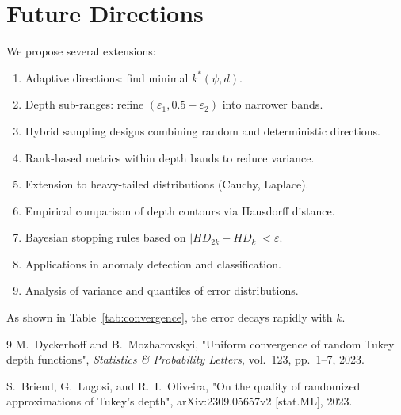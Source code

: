 \documentclass[12pt]{report}
\begin{document}
\section{Future Directions}
We propose several extensions:
\begin{enumerate}
  \item Adaptive directions: find minimal $k^*(\psi,d)$.  
  \item Depth sub-ranges: refine $(\varepsilon_1,0.5-\varepsilon_2)$ into narrower bands.  
  \item Hybrid sampling designs combining random and deterministic directions.  
  \item Rank-based metrics within depth bands to reduce variance.  
  \item Extension to heavy-tailed distributions (Cauchy, Laplace).  
  \item Empirical comparison of depth contours via Hausdorff distance.  
  \item Bayesian stopping rules based on $|HD_{2k}-HD_k|<\varepsilon$.  
  \item Applications in anomaly detection and classification.  
  \item Analysis of variance and quantiles of error distributions.
\end{enumerate}
  
  As shown in Table~\ref{tab:convergence}, the error decays rapidly with $k$.


%   
%   
%

\begin{thebibliography}{9}
  M.~Dyckerhoff and B.~Mozharovskyi,
  "Uniform convergence of random Tukey depth functions",
  \emph{Statistics & Probability Letters}, vol.~123, pp.~1–7, 2023.

  S.~Briend, G.~Lugosi, and R.~I.~Oliveira,
  "On the quality of randomized approximations of Tukey’s depth",
  arXiv:2309.05657v2 [stat.ML], 2023.

\end{thebibliography}
\end{document}
